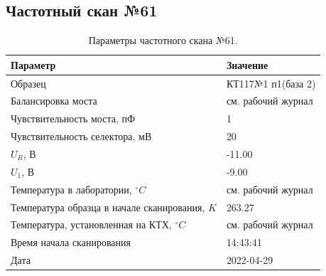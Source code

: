 \subsection{Частотный скан №61}
\begin{table}[!ht]
    \centering
    \caption{Параметры частотного скана №61.}
    \begin{tabular}{|l|l|}
        \hline
        Параметр                                       & Значение                  \\ \hline
        Образец                                        & КТ117№1 п1(база 2)        \\ \hline
        Балансировка моста                             & см. рабочий журнал        \\ \hline
        Чувствительность моста, пФ                     & 1                         \\ \hline
        Чувствительность селектора, мВ                 & 20                        \\ \hline
        $U_R$, В                                       & -11.00                    \\ \hline
        $U_1$, В                                       & -9.00                     \\ \hline
        Температура в лаборатории, $^\circ C$          & см. рабочий журнал        \\ \hline
        Температура образца в начале сканирования, $K$ & 263.27                    \\ \hline
        Температура, установленная на КТХ, $^\circ C$  & см. рабочий журнал        \\ \hline
        Время начала сканирования                      & 14:43:41                  \\ \hline
        Дата                                           & 2022-04-29                \\ \hline
    \end{tabular}
    \label{table:frequency_scan_61}
\end{table}


